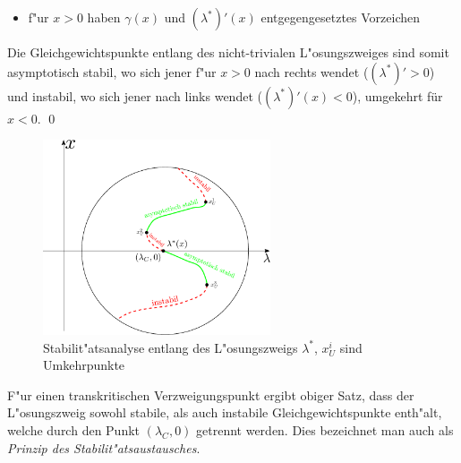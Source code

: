 \documentclass[a4paper, 13pt]{scrreprt}
\theoremstyle{definition} \newtheorem{definition}{Definition}[section]
\newenvironment{beweis}[1][Beweis]{\begin{trivlist}
\item[\hskip \labelsep {\bfseries #1}]}{\end{trivlist}}
\newenvironment{bemerkung}[1][Bemerkung]{\begin{trivlist}
\item[\hskip \labelsep {\bfseries #1}]}{\end{trivlist}}
\begin{document}
\begin{beweis}
\begin{itemize}
\item
f"ur $x>0$ haben $\gamma(x)$ und $(\lambda^*)'(x)$ entgegengesetztes Vorzeichen
\end{itemize}
Die Gleichgewichtspunkte entlang des nicht-trivialen L"osungszweiges sind somit asymptotisch stabil, wo sich jener f"ur $x>0$ nach rechts wendet ($(\lambda^*)'>0$) und instabil, wo sich jener nach links wendet ($(\lambda^*)'(x)<0$), umgekehrt für \(x<0\).
\qed
\end{beweis}
\begin{figure}[htpb]
		\centering
		\includegraphics[width=0.6\textwidth]{img/bifurkation/stab/stab_analyse.pdf}
		\caption{Stabilit"atsanalyse entlang des L"osungszweigs $\lambda^*$, $x_U^i$ sind Umkehrpunkte}
\end{figure}
\begin{bemerkung}
F"ur einen transkritischen Verzweigungspunkt ergibt obiger Satz, dass der L"osungszweig sowohl stabile, als auch instabile Gleichgewichtspunkte enth"alt, welche durch den Punkt $(\lambda_C, 0)$ getrennt werden. Dies bezeichnet man auch als  \emph{Prinzip des Stabilit"atsaustausches}.
\end{bemerkung}
\end{document}
